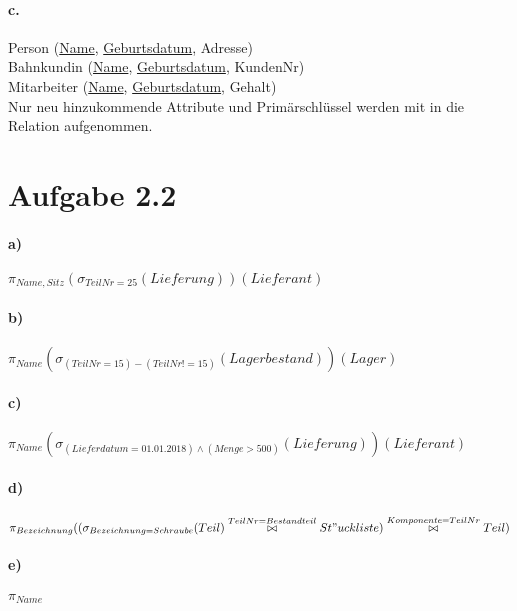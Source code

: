 \documentclass[12pt]{article}
\begin{document}
 	\paragraph*{c.}
 	Person (\underline{Name}, \underline{Geburtsdatum}, Adresse) \\[1,3em]
 	
 	Bahnkundin (\underline{Name}, \underline{Geburtsdatum}, KundenNr) \\[1,3em]
 	
 	Mitarbeiter (\underline{Name}, \underline{Geburtsdatum}, Gehalt) \\[1,3em]
 	Nur neu hinzukommende Attribute und Primärschlüssel werden mit in die Relation aufgenommen.
 		
 	\section*{Aufgabe 2.2}
 	
 	\paragraph*{a)}
 	$\pi_{Name, Sitz}(\sigma_{TeilNr=25}(Lieferung))(Lieferant)$
 	
 	\paragraph*{b)}
 	$\pi_{Name}(\sigma_{(TeilNr=15) - (TeilNr != 15)}(Lagerbestand))(Lager)$
 	
 	
 	\paragraph*{c)}
 	$\pi_{Name}(\sigma_{(Lieferdatum = 01.01.2018) \wedge (Menge > 500)}(Lieferung))(Lieferant)$
 	
 	
 	\paragraph*{d)}
 	$\pi_{Bezeichnung}(\large(\sigma_{Bezeichnung=Schraube}(Teil) \overset{TeilNr = Bestandteil}{\bowtie} St"uckliste\large) \overset{Komponente = TeilNr}{\bowtie} Teil)$
 	
 	\paragraph*{e)}
 	$\pi_{Name}$
 
\end{document}
